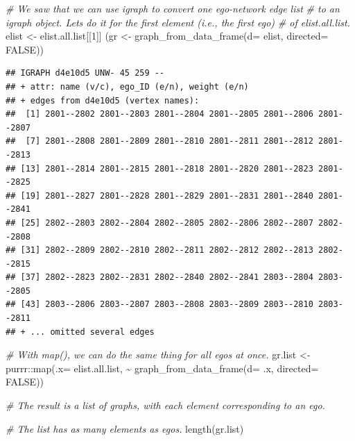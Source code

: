 \documentclass[
]{book}
\newenvironment{Shaded}{\begin{snugshade}}{\end{snugshade}}
\newcommand{\AttributeTok}[1]{\textcolor[rgb]{0.77,0.63,0.00}{#1}}
\newcommand{\CommentTok}[1]{\textcolor[rgb]{0.56,0.35,0.01}{\textit{#1}}}
\newcommand{\ConstantTok}[1]{\textcolor[rgb]{0.00,0.00,0.00}{#1}}
\newcommand{\DecValTok}[1]{\textcolor[rgb]{0.00,0.00,0.81}{#1}}
\newcommand{\FunctionTok}[1]{\textcolor[rgb]{0.00,0.00,0.00}{#1}}
\newcommand{\NormalTok}[1]{#1}
\newcommand{\OtherTok}[1]{\textcolor[rgb]{0.56,0.35,0.01}{#1}}
\newcommand{\SpecialCharTok}[1]{\textcolor[rgb]{0.00,0.00,0.00}{#1}}
\begin{document}
\begin{Shaded}
\begin{Highlighting}[]
\CommentTok{\# We saw that we can use igraph to convert one ego{-}network edge list}
\CommentTok{\# to an igraph object. Let\textquotesingle{}s do it for the first element (i.e., the first ego)}
\CommentTok{\# of elist.all.list.}
\NormalTok{elist }\OtherTok{\textless{}{-}}\NormalTok{ elist.all.list[[}\DecValTok{1}\NormalTok{]]}
\NormalTok{(gr }\OtherTok{\textless{}{-}} \FunctionTok{graph\_from\_data\_frame}\NormalTok{(}\AttributeTok{d=}\NormalTok{ elist, }\AttributeTok{directed=} \ConstantTok{FALSE}\NormalTok{))}
\end{Highlighting}
\end{Shaded}

\begin{verbatim}
## IGRAPH d4e10d5 UNW- 45 259 -- 
## + attr: name (v/c), ego_ID (e/n), weight (e/n)
## + edges from d4e10d5 (vertex names):
##  [1] 2801--2802 2801--2803 2801--2804 2801--2805 2801--2806 2801--2807
##  [7] 2801--2808 2801--2809 2801--2810 2801--2811 2801--2812 2801--2813
## [13] 2801--2814 2801--2815 2801--2818 2801--2820 2801--2823 2801--2825
## [19] 2801--2827 2801--2828 2801--2829 2801--2831 2801--2840 2801--2841
## [25] 2802--2803 2802--2804 2802--2805 2802--2806 2802--2807 2802--2808
## [31] 2802--2809 2802--2810 2802--2811 2802--2812 2802--2813 2802--2815
## [37] 2802--2823 2802--2831 2802--2840 2802--2841 2803--2804 2803--2805
## [43] 2803--2806 2803--2807 2803--2808 2803--2809 2803--2810 2803--2811
## + ... omitted several edges
\end{verbatim}

\begin{Shaded}
\begin{Highlighting}[]
\CommentTok{\# With map(), we can do the same thing for all egos at once.}
\NormalTok{gr.list }\OtherTok{\textless{}{-}}\NormalTok{ purrr}\SpecialCharTok{::}\FunctionTok{map}\NormalTok{(}\AttributeTok{.x=}\NormalTok{ elist.all.list, }
                      \SpecialCharTok{\textasciitilde{}} \FunctionTok{graph\_from\_data\_frame}\NormalTok{(}\AttributeTok{d=}\NormalTok{ .x, }\AttributeTok{directed=} \ConstantTok{FALSE}\NormalTok{))}

\CommentTok{\# The result is a list of graphs, with each element corresponding to an ego.}

\CommentTok{\# The list has as many elements as egos.}
\FunctionTok{length}\NormalTok{(gr.list)}
\end{Highlighting}
\end{Shaded}
\end{document}
